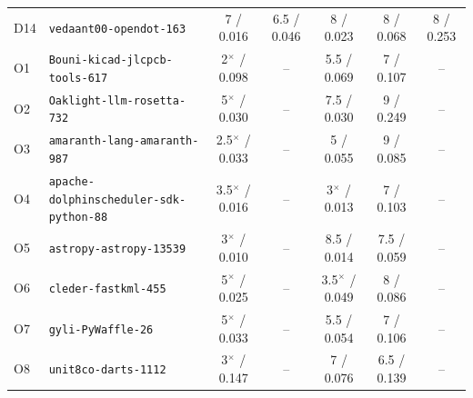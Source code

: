 \begin{longtable}{llccccc}
D14 & \texttt{vedaant00-opendot-163} & 7 / 0.016 & 6.5 / 0.046 & 8 / 0.023 & 8 / 0.068 & 8 / 0.253\\
O1 & \texttt{Bouni-kicad-jlcpcb-tools-617} & 2$^\times$ / 0.098 & -- & 5.5 / 0.069 & 7 / 0.107 & --\\
O2 & \texttt{Oaklight-llm-rosetta-732} & 5$^\times$ / 0.030 & -- & 7.5 / 0.030 & 9 / 0.249 & --\\
O3 & \texttt{amaranth-lang-amaranth-987} & 2.5$^\times$ / 0.033 & -- & 5 / 0.055 & 9 / 0.085 & --\\
O4 & \texttt{apache-dolphinscheduler-sdk-python-88} & 3.5$^\times$ / 0.016 & -- & 3$^\times$ / 0.013 & 7 / 0.103 & --\\
O5 & \texttt{astropy-astropy-13539} & 3$^\times$ / 0.010 & -- & 8.5 / 0.014 & 7.5 / 0.059 & --\\
O6 & \texttt{cleder-fastkml-455} & 5$^\times$ / 0.025 & -- & 3.5$^\times$ / 0.049 & 8 / 0.086 & --\\
O7 & \texttt{gyli-PyWaffle-26} & 5$^\times$ / 0.033 & -- & 5.5 / 0.054 & 7 / 0.106 & --\\
O8 & \texttt{unit8co-darts-1112} & 3$^\times$ / 0.147 & -- & 7 / 0.076 & 6.5 / 0.139 & --\\
\bottomrule\end{longtable}
